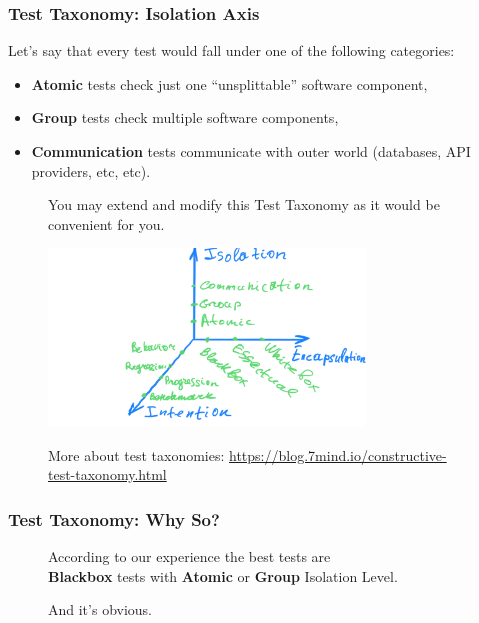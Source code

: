\documentclass[usenames,dvipsnames]{beamer}
\begin{document}
\begin{frame}
  \frametitle{Test Taxonomy: Isolation Axis}
  Let's say that every test would fall under one of the following categories:

  \begin{itemize}
    \item \textbf{Atomic} tests check just one ``unsplittable'' software component,
    \item \textbf{Group} tests check multiple software components,
    \item \textbf{Communication} tests communicate with outer world (databases, API providers, etc, etc).
  \end{itemize}
\end{frame}

\begin{frame}
  \begin{figure}
  \large You may extend and modify this Test Taxonomy as it would be convenient for you.
  \end{figure}

  \begin{figure}
    \includegraphics[width=0.75\textwidth]{media/ctt.png}
  \end{figure}

  \begin{figure}
  More about test taxonomies: \url{https://blog.7mind.io/constructive-test-taxonomy.html}
  \end{figure}
\end{frame}


\begin{frame}
  \frametitle{Test Taxonomy: Why So?}
  \begin{figure}
    According to our experience the best tests are \\
     \textbf{Blackbox} tests with \textbf{Atomic} or \textbf{Group} Isolation Level.
  \end{figure}
  \begin{figure}
    And it's obvious.
  \end{figure}
\end{frame}
\end{document}
